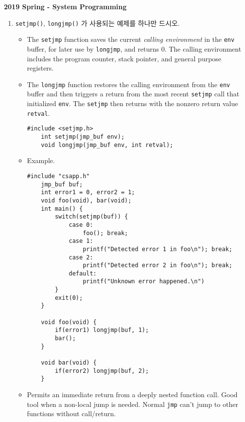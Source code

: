 \documentclass[12pt]{article}
\begin{document}
{\sffamily
\begin{center}
	\textbf{\large 2019 Spring - System Programming}
\end{center}
\begin{enumerate}
\item \texttt{setjmp()}, \texttt{longjmp()} 가 사용되는 예제를 하나만 드시오.
\begin{itemize}
	\item The \texttt{setjmp} function saves the current \textit{calling environment} in the \texttt{env} buffer, for later use by \texttt{longjmp}, and returns 0. The calling environment includes the program counter, stack pointer, and general purpose registers.
	\item The \texttt{longjmp} function restores the calling environment from the \texttt{env} buffer and then triggers a return from the most recent \texttt{setjmp} call that initialized \texttt{env}. The \texttt{setjmp} then returns with the nonzero return value \texttt{retval}.
	\begin{lstlisting}[style=Cstyle]
	#include <setjmp.h>
	int setjmp(jmp_buf env);
	void longjmp(jmp_buf env, int retval);\end{lstlisting}
	\item Example.
	\begin{lstlisting}[style=Cstyle]
	#include "csapp.h"
	jmp_buf buf;
	int error1 = 0, error2 = 1;
	void foo(void), bar(void);
	int main() {
		switch(setjmp(buf)) {
			case 0:
				foo(); break;
			case 1:
				printf("Detected error 1 in foo\n"); break;
			case 2:
				printf("Detected error 2 in foo\n"); break;
			default:
				printf("Unknown error happened.\n")
		}
		exit(0);
	}
	
	void foo(void) {
		if(error1) longjmp(buf, 1);
		bar();
	}
	
	void bar(void) {
		if(error2) longjmp(buf, 2);
	}
\end{lstlisting}
	\item Permits an immediate return from a deeply nested function call. Good tool when a non-local jump is needed. Normal \texttt{jmp} can't jump to other functions without call/return.
\end{itemize}


\end{enumerate}}
\end{document}
